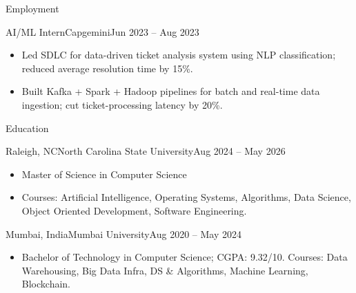 \documentclass[]{mcdowellcv}
\begin{document}
\begin{cvsection}{Employment}
  \begin{cvsubsection}{AI/ML Intern}{Capgemini}{Jun 2023 -- Aug 2023}
    \begin{itemize}
      \item Led SDLC for data-driven ticket analysis system using NLP classification; reduced average resolution time by 15\%.
      \item Built Kafka + Spark + Hadoop pipelines for batch and real-time data ingestion; cut ticket-processing latency by 20\%.
    \end{itemize}
    \vspace{-1.5pt}
  \end{cvsubsection}
\end{cvsection}

\begin{cvsection}{Education}
  \begin{cvsubsection}{Raleigh, NC}{North Carolina State University}{Aug 2024 -- May 2026}
    \begin{itemize}
      \item Master of Science in Computer Science
      \item Courses: Artificial Intelligence, Operating Systems, Algorithms, Data Science, Object Oriented Development, Software Engineering.
    \end{itemize}
    \vspace{-1.5pt}
  \end{cvsubsection}

  \begin{cvsubsection}{Mumbai, India}{Mumbai University}{Aug 2020 -- May 2024}
    \begin{itemize}
      \item Bachelor of Technology in Computer Science; CGPA: 9.32/10. Courses: Data Warehousing, Big Data Infra, DS \& Algorithms, Machine Learning, Blockchain.
    \end{itemize}
    \vspace{-1.5pt}
  \end{cvsubsection}
\end{cvsection}
\end{document}
